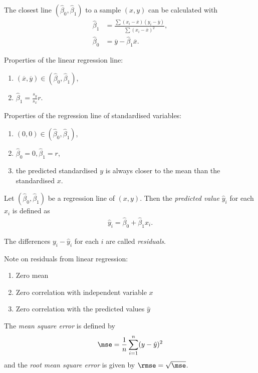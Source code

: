 \documentclass{article}
\renewcommand{\bar}{\overline}
\begin{document}
\begin{theorem}
	The closest line $(\hat\beta_0,\hat\beta_1)$ to a sample $(x,y)$ can be calculated with
	\begin{align*}
		\hat\beta_1 & =\frac{\sum(x_i-\bar x)(y_i-\bar y)}{\sum(x_i-\bar x)^2}, \\
		\hat\beta_0 & =\bar y - \hat\beta_1\bar x.
	\end{align*}
\end{theorem}
Properties of the linear regression line:
\begin{enumerate}
	\item $(\bar x, \bar y)\in(\hat\beta_0, \hat\beta_1)$,
	\item $\hat\beta_1 = \frac{s_y}{s_x}r$.
\end{enumerate}
Properties of the regression line of standardised variables:
\begin{enumerate}
	\item $(0,0)\in(\hat\beta_0,\hat\beta_1)$,
	\item $\hat\beta_0=0,\hat\beta_1=r$,
	\item the predicted standardised $y$ is always closer to the mean than the standardised $x$.
\end{enumerate}
\begin{definition}
	Let $(\hat\beta_0,\hat\beta_1)$ be a regression line of $(x,y)$. Then the
	\emph{predicted value} $\hat y_i$ for each $x_i$ is defined as
	\begin{align*}
		\hat y_i = \hat\beta_0 + \hat\beta_1 x_i.
	\end{align*}
\end{definition}
\begin{definition}
	The differences $y_i - \hat y_i$ for each $i$ are called \emph{residuals}.
\end{definition}
Note on residuals from linear regression:
\begin{enumerate}
	\item Zero mean
	\item Zero correlation with independent variable $x$
	\item Zero correlation with the predicted values $\hat y$
\end{enumerate}
\begin{definition}
	The \emph{mean square error} is defined by
	\begin{align*}
		\mse = \frac{1}{n}\sum_{i=1}^n (y-\hat y)^2
	\end{align*}
	and the \emph{root mean square error} is given by $\rmse=\sqrt{\mse}$.
\end{definition}
\end{document}
